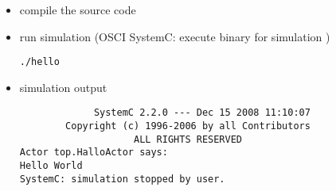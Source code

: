 \begin{frame}[fragile=singleslide]
\begin{itemize}
\item compile the source code
\item run simulation (OSCI SystemC: execute binary for simulation )
\begin{lstlisting}
./hello
\end{lstlisting}
\item simulation output
\begin{lstlisting}
             SystemC 2.2.0 --- Dec 15 2008 11:10:07
        Copyright (c) 1996-2006 by all Contributors
                    ALL RIGHTS RESERVED
Actor top.HalloActor says:
Hello World
SystemC: simulation stopped by user.
\end{lstlisting}
\end{itemize}
\end{frame}





